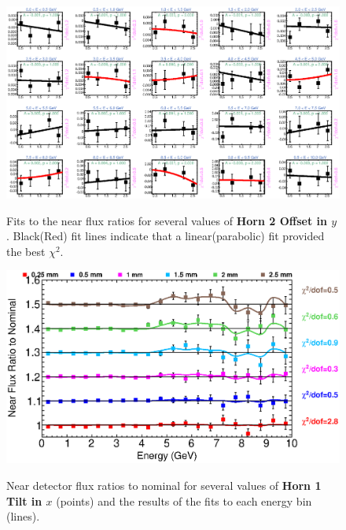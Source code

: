 {\begin{figure}[ht]
  \begin{center}
    {\includegraphics[width=5.0in]{figures/Horn2YOffset_near_fits.eps}}
  \end{center}
\caption{ Fits to the near flux ratios for several values of {\bf Horn 2 Offset in $y$}. Black(Red) fit lines indicate that a linear(parabolic) fit provided the best $\chi^2$. }
\end{figure}

\begin{figure}[ht]
  \begin{center}
    {\includegraphics[width=6.0in]{figures/Horn1XTilt_near_summary.eps}}
  \end{center}
\caption{ Near detector flux ratios to nominal for several values of {\bf Horn 1 Tilt in $x$} (points) and the results of the fits to each energy bin (lines).}
\end{figure}

}
